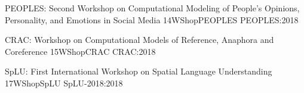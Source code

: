    \begin{wsschedule}
   {PEOPLES: Second Workshop on Computational Modeling of People's Opinions, Personality, and Emotions in Social Media}
   {14}{WShopPEOPLES}
   {PEOPLES:2018}
   {\WShopLocPEOPLES}
   
 \end{wsschedule}

   \begin{wsschedule}
   {CRAC: Workshop on Computational Models of Reference, Anaphora and Coreference}
   {15}{WShopCRAC}
   {CRAC:2018}
   {\WShopLocCRAC}
   
 \end{wsschedule}

 \begin{wsschedule}
   {SpLU: First International Workshop on Spatial Language Understanding}
   {17}{WShopSpLU}
{SpLU-2018:2018}
   {\WShopLocSpLU}
   
 \end{wsschedule}



\clearpage{\thispagestyle{emptyheader}\cleardoublepage}
